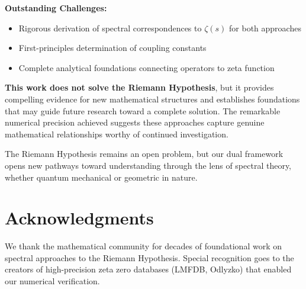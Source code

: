 \documentclass[12pt]{article}
\begin{document}
\textbf{Outstanding Challenges:}
\begin{itemize}
\item Rigorous derivation of spectral correspondences to $\zeta(s)$ for both approaches
\item First-principles determination of coupling constants
\item Complete analytical foundations connecting operators to zeta function
\end{itemize}

\textbf{This work does not solve the Riemann Hypothesis}, but it provides compelling evidence for new mathematical structures and establishes foundations that may guide future research toward a complete solution. The remarkable numerical precision achieved suggests these approaches capture genuine mathematical relationships worthy of continued investigation.

The Riemann Hypothesis remains an open problem, but our dual framework opens new pathways toward understanding through the lens of spectral theory, whether quantum mechanical or geometric in nature.

\section*{Acknowledgments}

We thank the mathematical community for decades of foundational work on spectral approaches to the Riemann Hypothesis. Special recognition goes to the creators of high-precision zeta zero databases (LMFDB, Odlyzko) that enabled our numerical verification.
\end{document}
